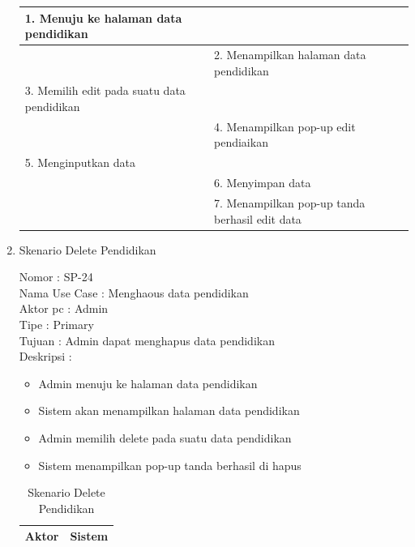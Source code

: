\begin{enumerate}
\begin{table}
\begin{tabular}{ | p{55mm} | p{70mm} |}
		1.	Menuju ke halaman data pendidikan &  \\
		
		\hline
		
		&  2.	Menampilkan halaman data pendidikan \\
		
		\hline
		
		3. Memilih edit pada suatu data pendidikan & \\
		
		\hline
		
		& 4.	Menampilkan pop-up edit pendiaikan \\
		
		\hline
		
		5.	Menginputkan data  & \\
		\hline
		
		& 6.	Menyimpan data \\
		\hline
		
		& 7.	Menampilkan pop-up tanda berhasil edit data \\
		\hline
		
	\end{tabular}
\end{table}

\item Skenario Delete Pendidikan

Nomor \kern 3.6pc : SP-24 \\
Nama Use Case : Menghaous data pendidikan \\
Aktor  pc : Admin \\
Tipe \kern 4.6pc : Primary \\
Tujuan \kern 3.6pc : Admin dapat menghapus data pendidikan \\
Deskripsi \kern 2.5pc : 

\begin{itemize}
	\item Admin menuju ke halaman data pendidikan
	\item Sistem akan menampilkan halaman data pendidikan
	\item Admin memilih delete pada suatu data pendidikan
	\item Sistem menampilkan pop-up tanda berhasil di hapus
	
\end{itemize}

\begin{table}
	\caption{Skenario Delete Pendidikan}
	\centering
	\begin{tabular}{ | p{55mm} | p{70mm}|}
		\hline 
		\textbf{Aktor} & \textbf{Sistem} \\
		\hline
		

\end{tabular}
\end{table}
\end{enumerate}
